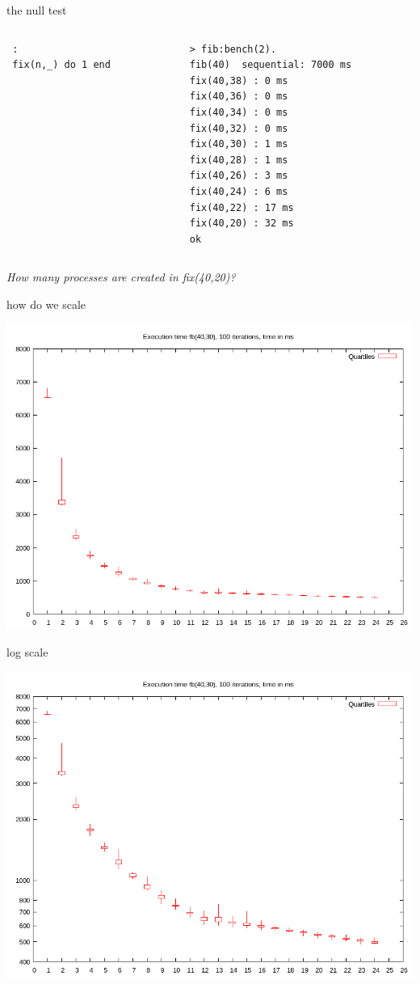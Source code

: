 \begin{frame}[fragile]{the null test}

\begin{columns}
\begin{column}{0.5\linewidth}
\begin{verbatim}
 :
 fix(n,_) do 1 end
\end{verbatim}
\end{column}
\pause
\begin{column}{0.5\linewidth}
\begin{verbatim}
> fib:bench(2).
fib(40)  sequential: 7000 ms
fix(40,38) : 0 ms
fix(40,36) : 0 ms
fix(40,34) : 0 ms
fix(40,32) : 0 ms
fix(40,30) : 1 ms
fix(40,28) : 1 ms
fix(40,26) : 3 ms
fix(40,24) : 6 ms
fix(40,22) : 17 ms
fix(40,20) : 32 ms
ok
\end{verbatim}
\end{column}
\end{columns}

\pause\vspace{20pt} 
{\em How many processes are created in fix(40,20)?}

\end{frame}

\begin{frame}{how do we scale}

\includegraphics[width=0.6\linewidth]{first.png}

\end{frame}

\begin{frame}{log scale}

\includegraphics[width=0.6\linewidth]{logy.png}

\end{frame}

